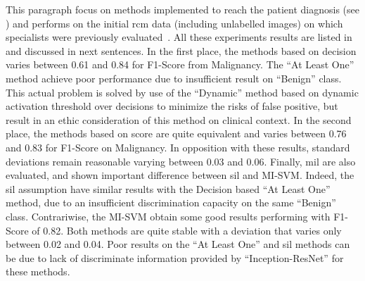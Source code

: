 \documentclass[journal,article,submit,moreauthors,pdftex, applsci]{Definitions/mdpi}
\begin{document}
This paragraph focus on methods implemented to reach the patient diagnosis (see ) and performs on the initial \ac{rcm} data (including unlabelled images) on which specialists were previously evaluated~\cite{Cinotti2018}. All these experiments results are listed in  and discussed in next sentences. In the first place, the methods based on decision varies between 0.61 and 0.84 for F1-Score from Malignancy. The “At Least One” method achieve poor performance due to insufficient result on “Benign” class. This actual problem is solved by use of the “Dynamic” method based on dynamic activation threshold over decisions to minimize the risks of false positive, but result in an ethic consideration of this method on clinical context. In the second place, the methods based on score are quite equivalent and varies between 0.76 and 0.83 for F1-Score on Malignancy. In opposition with these results, standard deviations remain reasonable varying between 0.03 and 0.06. Finally, \ac{mil} are also evaluated, and shown important difference between \ac{sil} and MI-SVM. Indeed, the \ac{sil} assumption have similar results with the Decision based “At Least One” method, due to an insufficient discrimination capacity on the same “Benign” class. Contrariwise, the MI-SVM obtain some good results performing with F1-Score of 0.82. Both methods are quite stable with a deviation that varies only between 0.02 and 0.04. Poor results on the “At Least One” and \ac{sil} methods can be due to lack of discriminate information provided by “Inception-ResNet” for these methods.\par
\end{document}
